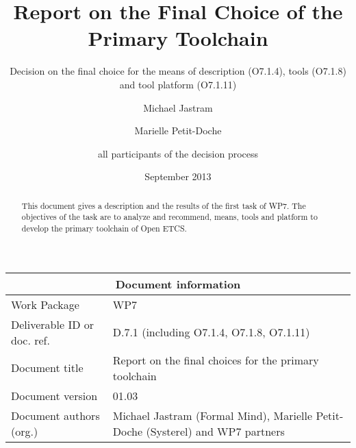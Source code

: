 \documentclass{template/openetcs_report}
\begin{document}
\frontmatter
{}




\title{Report on the Final Choice of the Primary Toolchain }

\subtitle{ Decision on the final choice for the means of description (O7.1.4), tools (O7.1.8) and tool platform (O7.1.11)}

\date{September 2013}


\author{Michael Jastram}

\author{Marielle Petit-Doche}

\author{all participants of the decision process}

 

\begin{abstract}
This document gives  a description and the results of the first task of WP7. The objectives of the task are to analyze and recommend, means, tools and platform to develop the primary toolchain of Open ETCS.

\end{abstract}

\maketitle
\tableofcontents
\listoffiguresandtables
\newpage


\begin{tabular}{|p{4.4cm}|p{8.7cm}|}
\hline
\multicolumn{2}{|c|}{Document information} \\
\hline
Work Package &  WP7  \\
Deliverable ID or doc. ref. & D.7.1 (including O7.1.4, O7.1.8, O7.1.11) \\
\hline
Document title & Report on the final choices for the primary toolchain \\
Document version & 01.03 \\
Document authors (org.)  & Michael Jastram (Formal Mind), Marielle Petit-Doche (Systerel) and WP7 partners  \\
\hline
\end{tabular}
\end{document}
